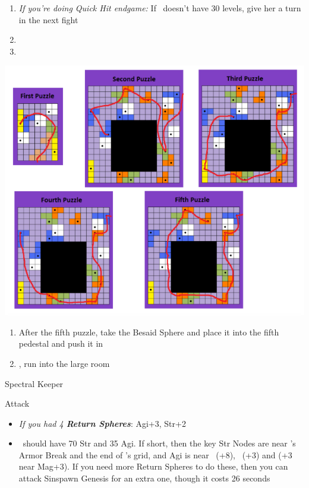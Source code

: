 \begin{enumerate}[resume]
	\item \textit{If you're doing Quick Hit endgame:} If \rikku\ doesn't have 30 levels, give her a turn in the next fight
	\item \formation{\tidus}{\yuna}{\auron}
	\item \save
\end{enumerate}
\includegraphics[scale=.9]{graphics/zanarkandpuzzles}
\begin{enumerate}[resume]
	\item After the fifth puzzle, take the Besaid Sphere and place it into the fifth pedestal and push it in
	\item \cs, run into the large room
\end{enumerate}
\begin{battle}[52000]{Spectral Keeper}
\begin{itemize}
	\summon{\bahamut}
	\bahamutf Attack
\end{itemize}
\end{battle}
\begin{spheregrid}
\begin{itemize}
	\item \textit{If you had 4 \textbf{Return Spheres}}: Agi+3, Str+2
	\item \yuna\ should have 70 Str and 35 Agi. If short, then the key Str Nodes are near \tidus's Armor Break and the end of \wakka's grid, and Agi is near \lulu\ (+8), \rikku\ (+3) and \wakka (+3 near Mag+3). If you need more Return Spheres to do these, then you can attack Sinspawn Genesis for an extra one, though it costs 26 seconds
\end{itemize}
\end{spheregrid}
